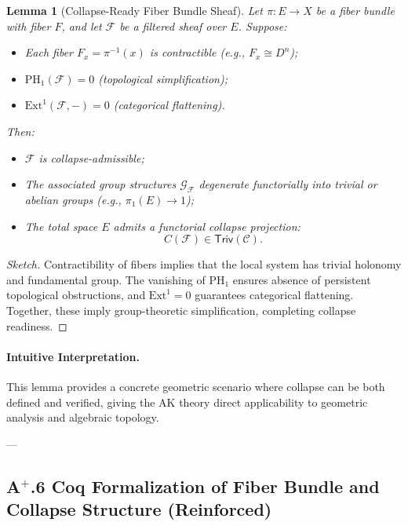 \documentclass[11pt]{article}
\newtheorem{lemma}[theorem]{Lemma}
\begin{document}
\begin{lemma}[Collapse-Ready Fiber Bundle Sheaf]
Let \( \pi : E \to X \) be a fiber bundle with fiber \( F \), and let \( \mathcal{F} \) be a filtered sheaf over \( E \). Suppose:
\begin{itemize}
    \item Each fiber \( F_x = \pi^{-1}(x) \) is contractible (e.g., \( F_x \cong D^n \));
    \item \( \mathrm{PH}_1(\mathcal{F}) = 0 \) (topological simplification);
    \item \( \mathrm{Ext}^1(\mathcal{F}, -) = 0 \) (categorical flattening).
\end{itemize}
Then:
\begin{itemize}
    \item \( \mathcal{F} \) is collapse-admissible;
    \item The associated group structures \( \mathcal{G}_{\mathcal{F}} \) degenerate functorially into trivial or abelian groups (e.g., \( \pi_1(E) \to 1 \));
    \item The total space \( E \) admits a functorial collapse projection:
    \[
    C(\mathcal{F}) \in \mathsf{Triv}(\mathcal{C}).
    \]
\end{itemize}
\end{lemma}

\begin{proof}[Sketch]
Contractibility of fibers implies that the local system has trivial holonomy and fundamental group. The vanishing of \( \mathrm{PH}_1 \) ensures absence of persistent topological obstructions, and \( \mathrm{Ext}^1 = 0 \) guarantees categorical flattening. Together, these imply group-theoretic simplification, completing collapse readiness.
\end{proof}

\paragraph{Intuitive Interpretation.}
This lemma provides a concrete geometric scenario where collapse can be both defined and verified, giving the AK theory direct applicability to geometric analysis and algebraic topology.

---

\subsection*{A$^{+}$.6 Coq Formalization of Fiber Bundle and Collapse Structure (Reinforced)}
\end{document}
